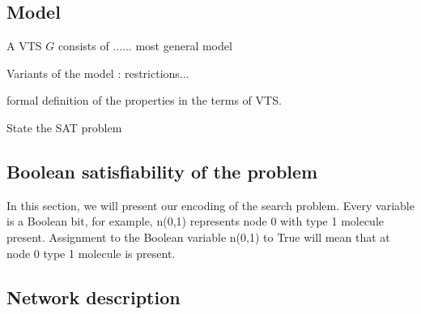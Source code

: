 
\subsection{Model}

\begin{df}
  A VTS $G$ consists of ...... most general model 
\end{df}


Variants of the model : restrictions... 


formal definition of the properties in the terms of VTS.


State the SAT problem


\subsection{Boolean satisfiability of the problem}

In this section, we will present our encoding of the search problem. Every variable is a Boolean bit, for example, n(0,1) represents node 0 with type 1 molecule present. Assignment to the Boolean variable n(0,1) to True will mean that at node 0 type 1 molecule is present. 


\subsection{Network description}

